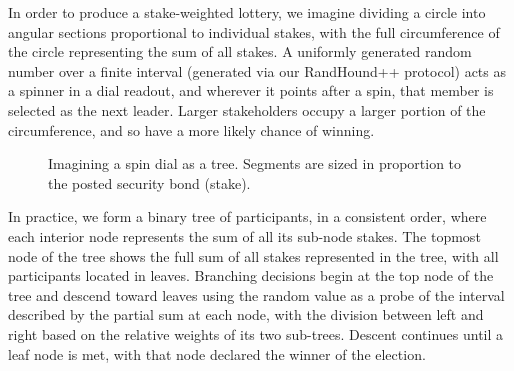 \documentclass[a4paper, 10pt, conference]{ieeeconf}
\begin{document}
In order to produce a stake-weighted lottery, we imagine dividing a circle into angular sections proportional to individual stakes, with the full circumference of the circle representing the sum of all stakes. A uniformly generated random number over a finite interval (generated via our RandHound++ protocol) acts as a spinner in a dial readout, and wherever it points after a spin, that member is selected as the next leader. Larger stakeholders occupy a larger portion of the circumference, and so have a more likely chance of winning.

\begin{figure}[h!]
\centering

%

\bigskip

%

\caption{Imagining a spin dial as a tree. Segments
are sized in proportion to the posted security bond (stake).}
  \label{fig:spinner}
\end{figure}

In practice, we form a binary tree of participants, in a consistent order, where each interior node represents the sum of all its sub-node stakes. The topmost node of the tree shows the full sum of all stakes represented in the tree, with all participants located in leaves. Branching decisions begin at the top node of the tree and descend toward leaves using the random value as a probe of the interval described by the partial sum at each node, with the division between left and right based on the relative weights of its two sub-trees. Descent continues until a leaf node is met, with that node declared the winner of the election. 
\end{document}
